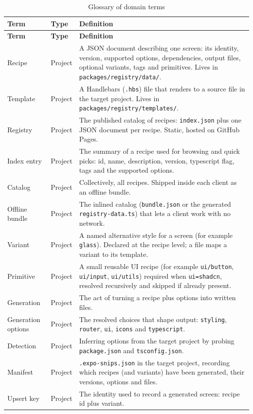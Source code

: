 \begin{longtable}{@{}L{3.8cm}L{1.6cm}L{8.8cm}@{}}
\caption{Glossary of domain terms}\\
\toprule
\textbf{Term} & \textbf{Type} & \textbf{Definition} \\
\midrule
\endfirsthead
\toprule
\textbf{Term} & \textbf{Type} & \textbf{Definition} \\
\midrule
\endhead
Recipe & Project & A JSON document describing one screen: its identity, version,
supported options, dependencies, output files, optional variants, tags and
primitives. Lives in \texttt{packages/registry/data/}. \\
Template & Project & A Handlebars (\texttt{.hbs}) file that renders to a source
file in the target project. Lives in \texttt{packages/registry/templates/}. \\
Registry & Project & The published catalog of recipes: \texttt{index.json} plus
one JSON document per recipe. Static, hosted on GitHub Pages. \\
Index entry & Project & The summary of a recipe used for browsing and quick
picks: id, name, description, version, typescript flag, tags and the supported
options. \\
Catalog & Project & Collectively, all recipes. Shipped inside each client as an
offline bundle. \\
Offline bundle & Project & The inlined catalog (\texttt{bundle.json} or the
generated \texttt{registry-data.ts}) that lets a client work with no network. \\
Variant & Project & A named alternative style for a screen (for example
\texttt{glass}). Declared at the recipe level; a file maps a variant to its
template. \\
Primitive & Project & A small reusable UI recipe (for example \texttt{ui/button},
\texttt{ui/input}, \texttt{ui/utils}) required when \texttt{ui=shadcn}, resolved
recursively and skipped if already present. \\
Generation & Project & The act of turning a recipe plus options into written
files. \\
Generation options & Project & The resolved choices that shape output:
\texttt{styling}, \texttt{router}, \texttt{ui}, \texttt{icons} and
\texttt{typescript}. \\
Detection & Project & Inferring options from the target project by probing
\texttt{package.json} and \texttt{tsconfig.json}. \\
Manifest & Project & \texttt{.expo-snips.json} in the target project, recording
which recipes (and variants) have been generated, their versions, options and
files. \\
Upsert key & Project & The identity used to record a generated screen: recipe id
plus variant. \\
\bottomrule
\end{longtable}

